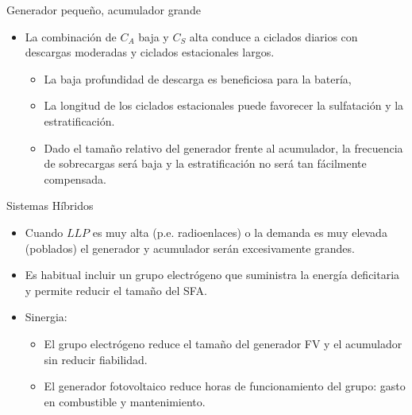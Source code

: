 \documentclass[xcolor={usenames,svgnames,dvipsnames}]{beamer}
\begin{document}
\begin{frame}[label={sec:org74e0fb0}]{Generador pequeño, acumulador grande}
\begin{itemize}
\item La \alert{combinación de \(C_{A}\) baja y \(C_{S}\) alta} conduce a ciclados
diarios con descargas moderadas y ciclados estacionales largos.

\begin{itemize}
\item La baja profundidad de descarga es beneficiosa para la batería,

\item La longitud de los ciclados estacionales puede favorecer la
sulfatación y la estratificación.

\item Dado el tamaño relativo del generador frente al acumulador, la
frecuencia de sobrecargas será baja y la estratificación no será
tan fácilmente compensada.
\end{itemize}
\end{itemize}
\end{frame}

\begin{frame}[label={sec:orgad455d6}]{Sistemas Híbridos}
\begin{itemize}
\item Cuando \(LLP\) es muy alta (p.e. radioenlaces) o la demanda es muy
elevada (poblados) el generador y acumulador serán excesivamente
grandes.

\item Es habitual incluir un grupo electrógeno que suministra la energía
deficitaria y permite reducir el tamaño del SFA.

\item Sinergia:

\begin{itemize}
\item El grupo electrógeno reduce el tamaño del generador FV y el
acumulador sin reducir fiabilidad.

\item El generador fotovoltaico reduce horas de funcionamiento del
grupo: gasto en combustible y mantenimiento.
\end{itemize}
\end{itemize}
\end{frame}
\end{document}
